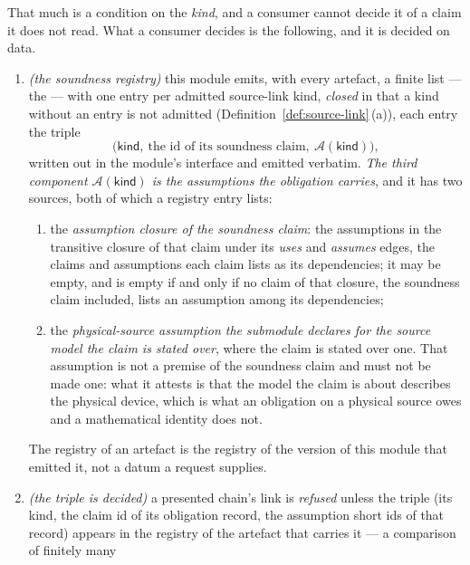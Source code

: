 \begin{definition}
That much is a condition on the \emph{kind}, and a consumer cannot decide it
of a claim it does not read. What a consumer decides is the following, and it
is decided on data.
\begin{enumerate}[label=(A\arabic*),leftmargin=3.0em]
\item \emph{(the soundness registry)} this module emits, with every artefact,
a finite list --- the  --- with one entry per
admitted source-link kind, \emph{closed} in that a kind without an entry is
not admitted (Definition~\ref{def:source-link}\,(a)), each entry the triple
\begin{equation}\label{eq:registry}
  \big(\textsf{kind},\ \text{the id of its soundness claim},\
  \mathcal{A}(\textsf{kind})\big) ,
\end{equation}
written out in the module's interface and emitted verbatim. \emph{The third
component $\mathcal{A}(\textsf{kind})$ is the assumptions the obligation
carries}, and it has two sources, both of which a registry entry lists:
\begin{enumerate}[label=(\alph*),leftmargin=2.2em]
\item the \emph{assumption closure of the soundness claim}: the assumptions
in the transitive closure of that claim under its \emph{uses} and
\emph{assumes} edges, the claims and assumptions each claim lists as its
dependencies; it may be empty, and is empty if and only if no claim of that
closure, the soundness claim included, lists an assumption among its
dependencies;
\item the \emph{physical-source assumption the submodule declares for the
source model the claim is stated over}, where the claim is stated over one.
That assumption is not a premise of the soundness claim and must not be made
one: what it attests is that the model the claim is about describes the
physical device, which is what an obligation on a physical source owes and a
mathematical identity does not.
\end{enumerate}
The registry of an artefact is the registry of the version of this module that
emitted it, not a datum a request supplies.
\item \emph{(the triple is decided)} a presented chain's link is
\emph{refused} unless the triple (its \textsf{kind}, the claim id of its
obligation record, the assumption short ids of that record) appears in the
registry of the artefact that carries it --- a comparison of finitely many

\end{enumerate}
\end{definition}

